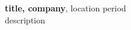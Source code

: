 \item\textbf{{{title}}, {{company}}}, {{location}} \hfill {\small{{period}}}\\[0.5em]
\textcolor{gray!40!black}{{{description}}}

